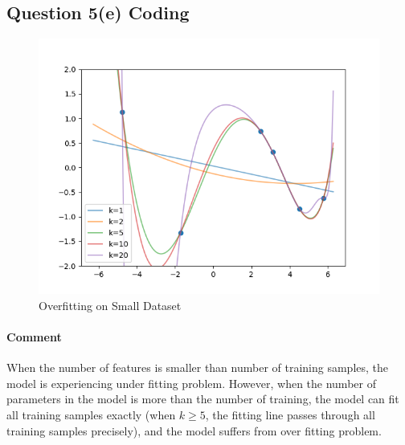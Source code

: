 \documentclass[11pt]{article}
\begin{document}
	\newpage
	\subsection{Question 5(e) Coding}
	\begin{figure}[h]
		\centering
		\includegraphics[width=0.6\linewidth]{src/featuremaps/5e.png}
		\caption{Overfitting on Small Dataset}
	\end{figure}
	\paragraph{Comment} When the number of features is smaller than number of training samples, the model is experiencing under fitting problem. However, when the number of parameters in the model is more than the number of training, the model can fit all training samples exactly (when $k \geq 5$, the fitting line passes through all training samples precisely), and the model suffers from over fitting problem.
\end{document}
